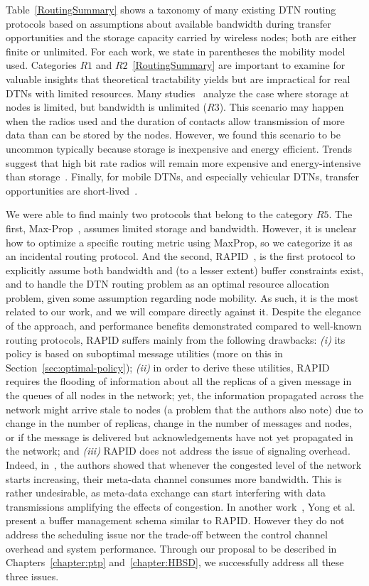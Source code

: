 Table~\ref{RoutingSummary} shows a taxonomy of many existing DTN routing protocols based on assumptions about available bandwidth during transfer opportunities and the storage
capacity carried by wireless nodes; both are either finite or unlimited. For each work, we state in parentheses the mobility model used. 
Categories $R1$ and $R2$~\ref{RoutingSummary} are important to examine for valuable insights that theoretical tractability yields but are impractical for real DTNs with limited resources. Many studies~\cite{Lindgren:probabilistic,Wearable,MVRouting} analyze the case where storage at nodes is limited, but bandwidth is unlimited ($R3$). This scenario may happen when the radios used and the duration of contacts allow
transmission of more data than can be stored by the nodes. However, we found this scenario to be uncommon typically because storage is inexpensive and energy efficient. Trends suggest that high bit rate radios will remain more expensive and energy-intensive than storage~\cite{PRESTO}. Finally, for mobile DTNs, and especially vehicular DTNs, transfer opportunities are short-lived~\cite{Levine:MaxProp}.

We were able to find mainly two protocols that belong to the category $R5$. The first, Max-Prop~\cite{Levine:MaxProp}, assumes limited storage and bandwidth. However, it is unclear how to optimize a specific routing metric using MaxProp, so we categorize it as an incidental routing protocol. And the second, RAPID~\cite{BalasubramanianLV07}, is the first protocol to explicitly assume both bandwidth and (to a lesser extent) buffer constraints exist, and to handle the DTN routing problem as an optimal resource allocation problem, given some assumption regarding node mobility. As such, it is the most related to our work, and we will compare  directly against it. Despite the elegance of the approach, and performance benefits demonstrated compared to well-known routing protocols, RAPID suffers mainly from the following drawbacks: \emph{(i)} its policy is based on suboptimal message utilities (more on this in Section~\ref{sec:optimal-policy}); \emph{(ii)} in order to derive these utilities, RAPID requires the flooding of information about all the replicas of a given message in the queues of all nodes in the network; yet, the information propagated across the network might arrive stale to nodes (a problem that the authors also note) due to change in the number of replicas, change in the number of messages and nodes, or if the message is delivered but acknowledgements have not yet propagated in the network; and \emph{(iii)} RAPID does not address the issue of signaling overhead. Indeed, in~\cite{Levine:Sigcomm07}, the authors showed that whenever the congested level of the network starts increasing, their meta-data channel consumes more bandwidth. This is rather undesirable, as meta-data exchange can start interfering with data transmissions amplifying the effects of congestion. In another work~\cite{AOBM}, Yong et al. present a buffer management schema similar to RAPID. However they do not address the scheduling issue nor the trade-off between the control channel overhead and system performance. Through our proposal to be described in Chapters~\ref{chapter:ptp} and~\ref{chapter:HBSD}, we successfully address all these three issues.

